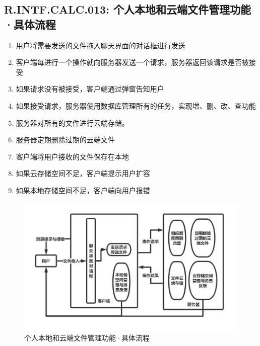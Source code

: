     \subsection{R.INTF.CALC.013: 个人本地和云端文件管理功能·具体流程}
    \begin{enumerate}
        \item 用户将需要发送的文件拖入聊天界面的对话框进行发送
        \item 客户端每进行一个操作就向服务器发送一个请求，服务器返回该请求是否被接受
        \item 如果请求没有被接受，客户端通过弹窗告知用户
        \item 如果接受请求，服务器使用数据库管理所有的任务，实现增、删、改、查功能
        \item 服务器对所有的文件进行云端存储。
        \item 服务器定期删除过期的云端文件
        \item 客户端将用户接收的文件保存在本地
        \item 如果云存储空间不足，客户端提示用户扩容
        \item 如果本地存储空间不足，客户端向用户报错
    \end{enumerate}
        \begin{figure}[h]
            \centering
            \includegraphics[scale=0.4]{OutlineDesign/figures/个人本地和云端文件管理功能·具体流程.png}
            \caption{个人本地和云端文件管理功能·具体流程}
            \label{fig:server_flow}
        \end{figure}
